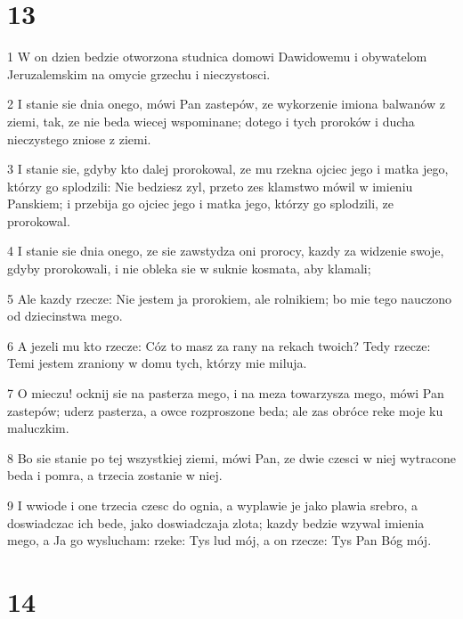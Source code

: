 \chapter{13}

\par 1 W on dzien bedzie otworzona studnica domowi Dawidowemu i obywatelom Jeruzalemskim na omycie grzechu i nieczystosci.
\par 2 I stanie sie dnia onego, mówi Pan zastepów, ze wykorzenie imiona balwanów z ziemi, tak, ze nie beda wiecej wspominane; dotego i tych proroków i ducha nieczystego zniose z ziemi.
\par 3 I stanie sie, gdyby kto dalej prorokowal, ze mu rzekna ojciec jego i matka jego, którzy go splodzili: Nie bedziesz zyl, przeto zes klamstwo mówil w imieniu Panskiem; i przebija go ojciec jego i matka jego, którzy go splodzili, ze prorokowal.
\par 4 I stanie sie dnia onego, ze sie zawstydza oni prorocy, kazdy za widzenie swoje, gdyby prorokowali, i nie obleka sie w suknie kosmata, aby klamali;
\par 5 Ale kazdy rzecze: Nie jestem ja prorokiem, ale rolnikiem; bo mie tego nauczono od dziecinstwa mego.
\par 6 A jezeli mu kto rzecze: Cóz to masz za rany na rekach twoich? Tedy rzecze: Temi jestem zraniony w domu tych, którzy mie miluja.
\par 7 O mieczu! ocknij sie na pasterza mego, i na meza towarzysza mego, mówi Pan zastepów; uderz pasterza, a owce rozproszone beda; ale zas obróce reke moje ku maluczkim.
\par 8 Bo sie stanie po tej wszystkiej ziemi, mówi Pan, ze dwie czesci w niej wytracone beda i pomra, a trzecia zostanie w niej.
\par 9 I wwiode i one trzecia czesc do ognia, a wyplawie je jako plawia srebro, a doswiadczac ich bede, jako doswiadczaja zlota; kazdy bedzie wzywal imienia mego, a Ja go wyslucham: rzeke: Tys lud mój, a on rzecze: Tys Pan Bóg mój.

\chapter{14}

